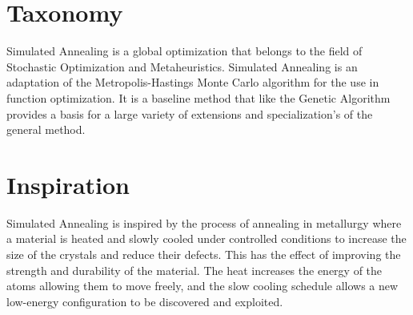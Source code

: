 \documentclass[a4paper, 11pt]{article}
\begin{document}
\section{Taxonomy}
\label{sec:taxonomy}
Simulated Annealing is a global optimization that belongs to the field of Stochastic Optimization and Metaheuristics.
Simulated Annealing is an adaptation of the Metropolis-Hastings Monte Carlo algorithm for the use in function optimization. It is a baseline method that like the Genetic Algorithm provides a basis for a large variety of extensions and specialization's of the general method.

\section{Inspiration}
\label{sec:inspiration}
Simulated Annealing is inspired by the process of annealing in metallurgy where a material is heated and slowly cooled under controlled conditions to increase the size of the crystals and reduce their defects. This has the effect of improving the strength and durability of the material. The heat increases the energy of the atoms allowing them to move freely, and the slow cooling schedule allows a new low-energy configuration to be discovered and exploited.
\end{document}
